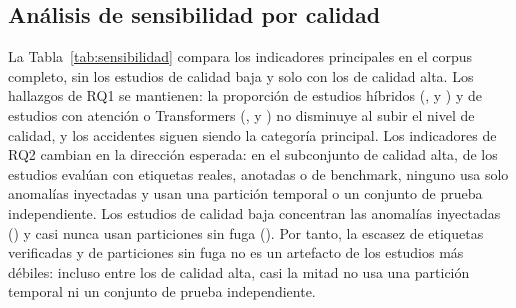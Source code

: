 \documentclass[12pt, a4paper]{article}
\begin{document}
\subsection{Análisis de sensibilidad por calidad}
\label{sec:sensibilidad}

La Tabla~\ref{tab:sensibilidad} compara los indicadores principales en el corpus completo, sin los estudios de calidad baja y solo con los de calidad alta. Los hallazgos de RQ1 se mantienen: la proporción de estudios híbridos (\PTodosHib, \PSinBajaHib{} y \PAltaHib) y de estudios con atención o Transformers (\PTodosTransf, \PSinBajaTransf{} y \PAltaTransf) no disminuye al subir el nivel de calidad, y los accidentes siguen siendo la categoría principal. Los indicadores de RQ2 cambian en la dirección esperada: en el subconjunto de calidad alta, \PAltaReal{} de los estudios evalúan con etiquetas reales, anotadas o de benchmark, ninguno usa solo anomalías inyectadas y \PAltaPartOK{} usan una partición temporal o un conjunto de prueba independiente. Los estudios de calidad baja concentran las anomalías inyectadas (\PBajaInyect) y casi nunca usan particiones sin fuga (\PBajaPartOK). Por tanto, la escasez de etiquetas verificadas y de particiones sin fuga no es un artefacto de los estudios más débiles: incluso entre los de calidad alta, casi la mitad no usa una partición temporal ni un conjunto de prueba independiente.
\end{document}
